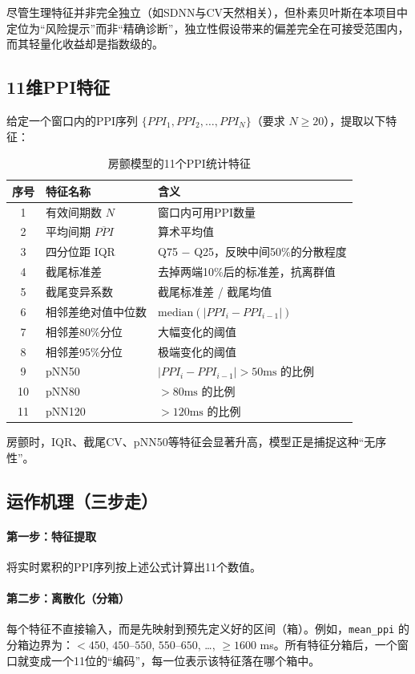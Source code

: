 \documentclass[UTF8]{ctexart}
\begin{document}
尽管生理特征并非完全独立（如SDNN与CV天然相关），但朴素贝叶斯在本项目中定位为“风险提示”而非“精确诊断”，独立性假设带来的偏差完全在可接受范围内，而其轻量化收益却是指数级的。

\subsection{11维PPI特征}
给定一个窗口内的PPI序列 $\{PPI_1, PPI_2, \ldots, PPI_N\}$（要求 $N \ge 20$），提取以下特征：

\begin{table}[ht]
\centering
\small
\begin{tabular}{@{}cll@{}}
\toprule
序号 & 特征名称 & 含义 \\
\midrule
1 & 有效间期数 $N$ & 窗口内可用PPI数量 \\
2 & 平均间期 $\overline{PPI}$ & 算术平均值 \\
3 & 四分位距 IQR & Q75 $-$ Q25，反映中间50\%的分散程度 \\
4 & 截尾标准差 & 去掉两端10\%后的标准差，抗离群值 \\
5 & 截尾变异系数 & 截尾标准差 / 截尾均值 \\
6 & 相邻差绝对值中位数 & $\text{median}(|PPI_i - PPI_{i-1}|)$ \\
7 & 相邻差80\%分位 & 大幅变化的阈值 \\
8 & 相邻差95\%分位 & 极端变化的阈值 \\
9 & pNN50 & $|PPI_i - PPI_{i-1}| > 50\text{ms}$ 的比例 \\
10 & pNN80 & $> 80\text{ms}$ 的比例 \\
11 & pNN120 & $> 120\text{ms}$ 的比例 \\
\bottomrule
\end{tabular}
\caption{房颤模型的11个PPI统计特征}
\end{table}

房颤时，IQR、截尾CV、pNN50等特征会显著升高，模型正是捕捉这种“无序性”。

\subsection{运作机理（三步走）}

\paragraph{第一步：特征提取} 将实时累积的PPI序列按上述公式计算出11个数值。

\paragraph{第二步：离散化（分箱）} 每个特征不直接输入，而是先映射到预先定义好的区间（箱）。例如，\texttt{mean\_ppi} 的分箱边界为：$<450$, $450$--$550$, $550$--$650$, \dots, $\ge1600$ ms。所有特征分箱后，一个窗口就变成一个11位的“编码”，每一位表示该特征落在哪个箱中。
\end{document}
